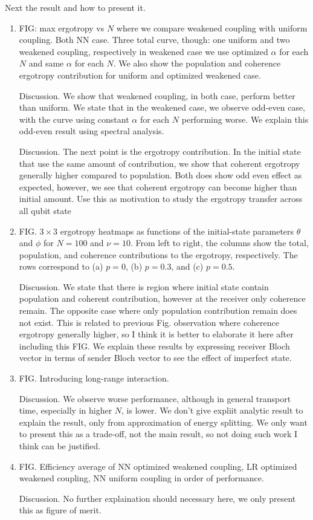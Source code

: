 \documentclass[../../../main.tex]{subfiles}
\begin{document}
Next the result and how to present it.
\begin{enumerate}
  \item FIG: max ergotropy vs $N$ where we compare weakened coupling with uniform coupling. Both NN case. 
  Three total curve, though: one uniform and two weakened coupling, respectively in weakened case we use optimized $\alpha$ for each $N$ and same $\alpha$ for each $N$. We also show the population and coherence ergotropy contribution for uniform and optimized weakened case.

  Discussion. We show that weakened coupling, in both case, perform better than uniform. 
  We state that in the weakened case, we observe odd-even case, with the curve using constant $\alpha$ for each $N$ performing worse. 
  We explain this odd-even result using spectral analysis.
  
  Discussion. The next point is the ergotropy contribution. In the initial state that use the same amount of contribution, we show that coherent ergotropy generally higher compared to population.
  Both does show odd even effect as expected, however, we see that coherent ergotropy can become higher than initial amount.
  Use this as motivation to study the ergotropy transfer across all qubit state

  \item FIG. $3 \times 3$ ergotropy heatmaps as functions of the initial-state parameters $\theta$ and $\phi$ for $N=100$ and $\nu=10$. From left to right, the columns show the total, population, and coherence contributions to the ergotropy, respectively. The rows correspond to (a) $p=0$, (b) $p=0.3$, and (c) $p=0.5$.
  
  Discussion. We state that there is region where initial state contain population and coherent contribution, however at the receiver only coherence remain.
  The opposite case where only population contribution remain does not exist.
  This is related to previous Fig. observation where coherence ergotropy generally higher, so I think it is better to elaborate it here after including this FIG.
  We explain these results by expressing receiver Bloch vector in terms of sender Bloch vector to see the effect of imperfect state. 
  
  \item FIG. Introducing long-range interaction.
  
  Discussion. We observe worse performance, although in general transport time, especially in higher $N$, is lower. 
  We don't give expliit analytic result to explain the result, only from approximation of energy splitting.
  We only want to present this as a trade-off, not the main result, so not doing such work I think can be justified.

  \item FIG. Efficiency average of NN optimized weakened coupling, LR optimized weakened coupling, NN uniform coupling in order of performance.
  
  Discussion. No further explaination should necessary here, we only present this as figure of merit.
\end{enumerate}
\end{document}
